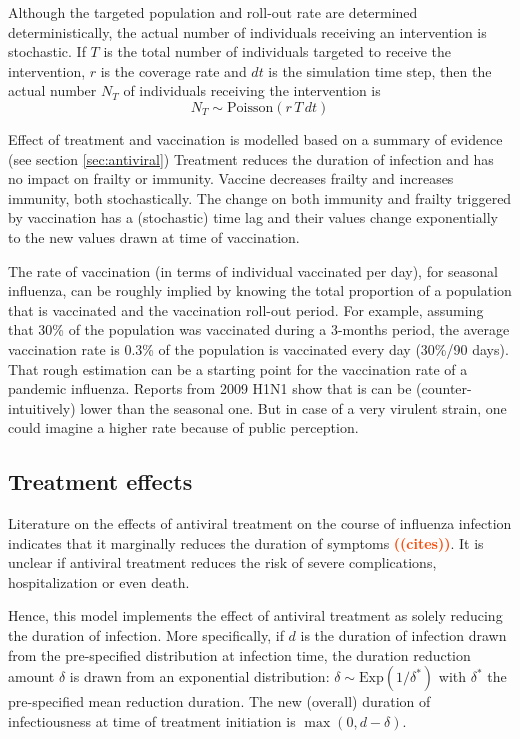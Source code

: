 \documentclass[11pt, onecolumn]{article}
\newcommand{\warning}[1]{\textbf{\textcolor{OrangeRed}{#1}}}
\begin{document}
Although the targeted population and roll-out rate are determined deterministically, the actual number of individuals receiving an intervention is stochastic. If $T$ is the total number of individuals targeted to receive the intervention, $r$ is the coverage rate and $dt$ is the simulation time step, then the actual number $N_T$ of individuals receiving the intervention is
\begin{equation}
N_T \sim \text{Poisson}(r\,T\,dt)
\end{equation}

Effect of treatment and vaccination is modelled based on a summary of evidence (see section \ref{sec:antiviral})
Treatment reduces the duration of infection and has no impact on frailty or immunity. Vaccine decreases frailty and increases immunity, both stochastically. The change on both immunity and frailty triggered by vaccination has a (stochastic) time lag and their values change exponentially to the new values drawn at time of vaccination.

The rate of vaccination (in terms of individual vaccinated per day), for seasonal influenza, can be roughly implied by knowing the total proportion of a population that is vaccinated and the vaccination roll-out period. For example, assuming that 30\% of the population was vaccinated during a 3-months period, the average vaccination rate is 0.3\% of the population is vaccinated every day (30\%/90 days).
That rough estimation can be a starting point for the vaccination rate of a pandemic influenza. Reports from 2009 H1N1 show that is can be (counter-intuitively) lower than the seasonal one. But in case of a very virulent strain, one could imagine a higher rate because of public perception. 

\subsection{Treatment effects}

Literature on the effects of antiviral treatment on the course of influenza infection indicates that it marginally reduces the duration of symptoms \warning{((cites))}. It is unclear if antiviral treatment reduces the risk of severe complications, hospitalization or even death. 

Hence, this model implements the effect of antiviral treatment as solely reducing the duration of infection. More specifically, if $d$ is the duration of infection drawn from the pre-specified distribution at infection time, the duration reduction amount $\delta$ is drawn from an exponential distribution: $\delta \sim \text{Exp}(1/\delta^*)$ with $\delta^*$ the pre-specified mean reduction duration. The new (overall) duration of infectiousness at time of treatment initiation is $\max(0, d-\delta)$.
\end{document}
